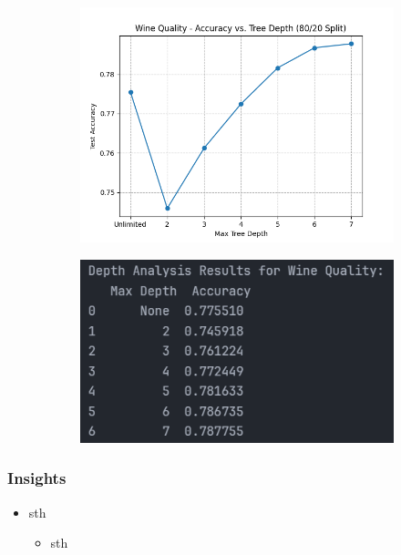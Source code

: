 \begin{figure}[H]
	\centering
	\begin{subfigure}{0.45\textwidth}
		\centering
		\includegraphics[width=\textwidth]{imgs/accuracy_vs_depth_wine_quality.png}
	\end{subfigure}
	\hfill
	\begin{subfigure}{0.45\textwidth}
		\centering
		\includegraphics[width=\textwidth]{imgs/accuracy_vs_depth_wine_quality__analysis.png}
	\end{subfigure}
\end{figure}

\subsubsection*{Insights}
\begin{itemize}
	\item sth
	      \begin{itemize}
		      \item sth
	      \end{itemize}
\end{itemize}

